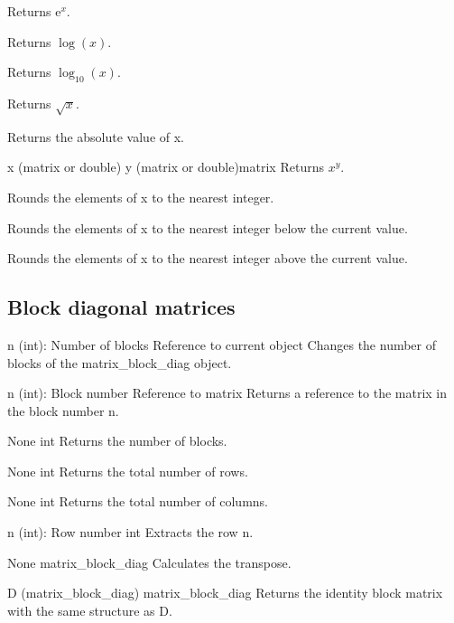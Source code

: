 {Returns $\mathrm{e}^x$.}

{Returns $\log(x)$.}

{Returns $\log_{10}(x)$.}

{Returns $\sqrt{x}$.}

{Returns the absolute value of x.}

{x (matrix or double)\newline
y (matrix or double)}{matrix}
{Returns $x^y$.}

{Rounds the elements of x to the nearest integer.}

{Rounds the elements of x to the nearest integer below the current value.}

{Rounds the elements of x to the nearest integer above the current value.}

\subsection{Block diagonal matrices}

{n (int): Number of blocks}
{Reference to current object}
{Changes the number of blocks of the matrix\_block\_diag object.}

{n (int): Block number}
{Reference to matrix}
{Returns a reference to the matrix in the block number n.}

{None}
{int}
{Returns the number of blocks.}

{None}
{int}
{Returns the total number of rows.}

{None}
{int}
{Returns the total number of columns.}

{n (int): Row number}
{int}
{Extracts the row n.}

{None}
{matrix\_block\_diag}
{Calculates the transpose.}

{D (matrix\_block\_diag)}
{matrix\_block\_diag}
{Returns the identity block matrix with the same structure as D.}


\funcrefend

